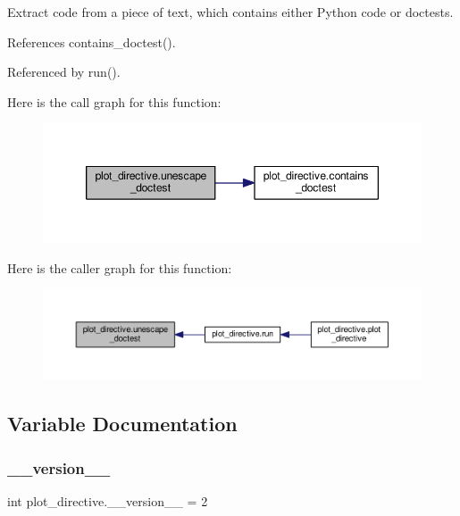 \begin{DoxyVerb}Extract code from a piece of text, which contains either Python code
or doctests.\end{DoxyVerb}
 

References contains\+\_\+doctest().



Referenced by run().

Here is the call graph for this function\+:
\nopagebreak
\begin{figure}[H]
\begin{center}
\leavevmode
\includegraphics[width=350pt]{namespaceplot__directive_aa899adfc2219ac7af0aa9ae176a2c11b_cgraph}
\end{center}
\end{figure}
Here is the caller graph for this function\+:
\nopagebreak
\begin{figure}[H]
\begin{center}
\leavevmode
\includegraphics[width=350pt]{namespaceplot__directive_aa899adfc2219ac7af0aa9ae176a2c11b_icgraph}
\end{center}
\end{figure}


\subsection{Variable Documentation}
\mbox{\label{namespaceplot__directive_a88acf135f41dd97c19461189de4702b2}} 
\subsubsection{\texorpdfstring{\+\_\+\+\_\+version\+\_\+\+\_\+}{\_\_version\_\_}}
{\footnotesize\ttfamily int plot\+\_\+directive.\+\_\+\+\_\+version\+\_\+\+\_\+ = 2\hspace{0.3cm}{\ttfamily [private]}}

